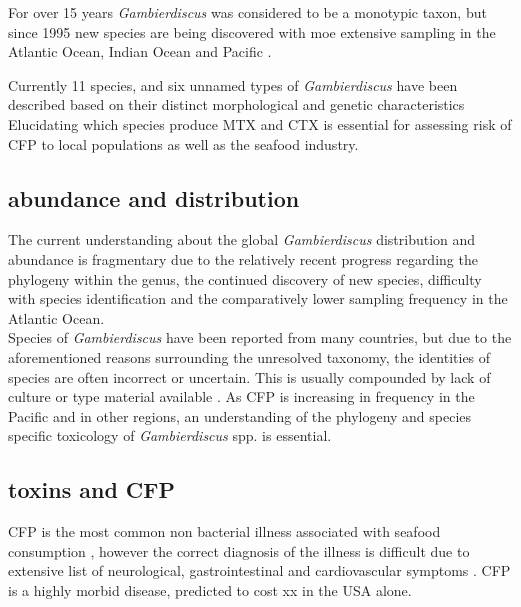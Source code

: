 \documentclass[12pt]{article}
\begin{document}
For over 15 years \emph{Gambierdiscus} was considered to be a monotypic taxon, but since 1995 new species are being discovered with moe extensive sampling in the Atlantic Ocean, Indian Ocean and Pacific \cite{faust1995observation,holmes1998gambierdiscus,litaker2009taxonomy,chinain1999morphology,fraga2011gambierdiscus,nishimura2014morphology}.

Currently 11 species, and six unnamed types of \emph{Gambierdiscus} have been described based on their distinct morphological and genetic characteristics \cite{faust1995observation,chinain1999morphology,litaker2009taxonomy,nishimura2014morphology,fraga2011gambierdiscus}
Elucidating which species produce MTX and CTX is essential for assessing risk of CFP to local populations as well as the seafood industry.

\subsection{abundance and distribution}
The current understanding about the global \emph{Gambierdiscus} distribution and abundance is fragmentary due to the relatively recent progress regarding the phylogeny within the genus, the continued discovery of new species, difficulty with species identification and the comparatively lower sampling frequency in the Atlantic Ocean. \\
Species of \emph{Gambierdiscus} have been reported from many countries, but due to the aforementioned reasons surrounding the unresolved taxonomy, the identities of species are often incorrect or uncertain. This is usually compounded by lack of culture or type material available \cite{marine2014}.
 As CFP is increasing in frequency in the Pacific \cite{skinner2011ciguatera} and in other regions, an understanding of the phylogeny and species specific toxicology of \emph{Gambierdiscus} spp. is essential.
 
  \subsection{toxins and CFP}
CFP is the most common non bacterial illness associated with seafood consumption \cite{friedman2008ciguatera}, however the correct diagnosis of the illness is difficult due to extensive list of neurological, gastrointestinal and cardiovascular symptoms \cite{sims1987theoretical}. CFP is a highly morbid disease, predicted to cost xx in the USA alone. 
\end{document}
